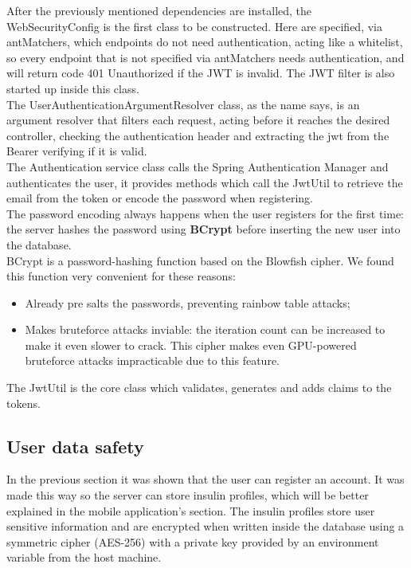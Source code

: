 After the previously mentioned dependencies are installed, the WebSecurityConfig is the first class to be constructed. Here are specified, via antMatchers, which
endpoints do not need authentication, acting like a whitelist, so every endpoint that is not specified via antMatchers needs authentication, and will return code 401
Unauthorized if the JWT is invalid. The JWT filter is also started up inside this class.\\

The UserAuthenticationArgumentResolver class, as the name says, is an argument resolver that filters each request, acting before it reaches the desired controller,
checking the authentication header and extracting the jwt from the Bearer verifying if it is valid.\\

The Authentication service class calls the Spring Authentication Manager and authenticates the user, it provides methods which call the JwtUtil
to retrieve the email from the token or encode the password when registering.\\

The password encoding always happens when the user registers for the first time: the server hashes the password using \textbf{BCrypt}\cite{bcrypt} before inserting the new
user into the database.\\

BCrypt is a password-hashing function based on the Blowfish\cite{blowfish} cipher. We found this function very convenient for these reasons:
\begin{itemize}
    \item Already pre salts the passwords, preventing rainbow table attacks\cite{rainbowtable};
    \item Makes bruteforce attacks inviable: the iteration count can be increased to make it even slower to crack.
    This cipher makes even GPU-powered bruteforce attacks impracticable due to this feature.
\end{itemize}

The JwtUtil is the core class which validates, generates and adds claims to the tokens.\\

\subsection{User data safety}

In the previous section it was shown that the user can register an account. It was made this way so the server can store
insulin profiles, which will be better explained in the mobile application's section. The insulin profiles store user sensitive
information and are encrypted when written inside the database using a symmetric cipher (AES-256) with a private key provided by an 
environment variable from the host machine.\\

